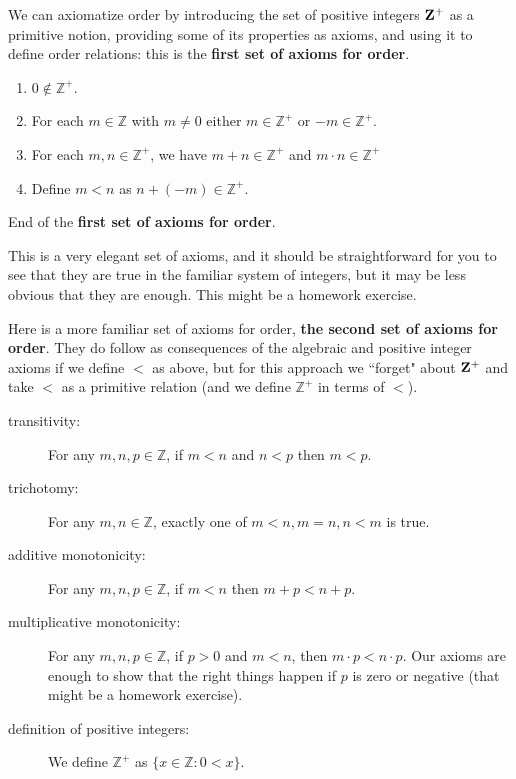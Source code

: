 \documentclass[12pt]{article}
\begin{document}
We can axiomatize order by introducing the set of positive integers ${\bf Z}^+$ as a primitive notion, providing some of its properties as axioms, and using it to define order relations:  this is the {\bf first set of axioms for order}.

\begin{enumerate}

\item $0 \not\in {\mathbb Z}^+$.

\item  For each $m \in {\mathbb Z}$ with $m \neq 0$ either $m \in {\mathbb Z}^+$ or  $-m \in {\mathbb Z}^+$.

\item For each $m,n \in {\mathbb Z}^+$, we have $m+n \in {\mathbb Z}^+$ and $m\cdot n \in {\mathbb Z}^+$

\item Define $m<n$ as $n+(-m) \in {\mathbb Z}^+$.

\end{enumerate}

End of the {\bf first set of axioms for order}.

This is a very elegant set of axioms, and it should be straightforward for you to see that they are true in the familiar system of integers, but it may be less obvious that they are enough.  This might be a homework exercise.

Here is a more familiar set of axioms for order, {\bf the second set of axioms for order}.  They do follow as consequences of the algebraic and positive integer axioms if we define $<$ as above, but for this approach we ``forget" about ${\bf Z}^+$ and take $<$ as a primitive relation (and we define ${\mathbb Z}^+$ in terms of $<$).

\begin{description}

\item[transitivity:]  For any $m,n,p \in {\mathbb Z}$,  if $m<n$ and $n<p$ then $m<p$.

\item[trichotomy:]  For any $m,n \in {\mathbb Z}$, exactly one of $m<n,m=n,n<m$ is true.

\item[additive monotonicity:]  For any $m,n,p \in {\mathbb Z}$, if $m<n$ then $m+p < n+p$.

\item[multiplicative monotonicity:]  For any $m,n,p \in {\mathbb Z}$, if $p  > 0$ and $m<n$, then $m\cdot p <n\cdot p$.  Our axioms are enough to show that the right things happen if $p$ is zero or negative (that might be a homework exercise).

\item  [definition of positive integers:]  We define ${\mathbb Z}^+$ as $\{x \in {\mathbb Z}:0<x\}$.

\end{description}
\end{document}
